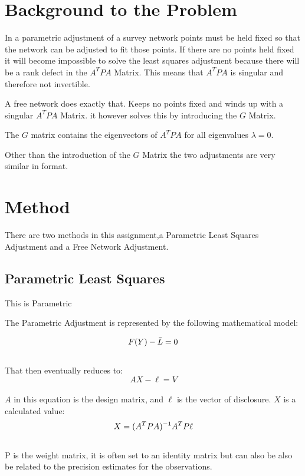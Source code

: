 \documentclass[11pt,a4paper]{article}
\begin{document}
	
	\section{Background to the Problem}
	
	In a parametric adjustment of a survey network points must be held fixed so that the network can be adjusted to fit those points. If there are no points held fixed it will become impossible to solve the least squares adjustment because there will be a rank defect in the $A^TPA$ Matrix. This means that $A^TPA$ is singular and therefore not invertible.
	
	A free network does exactly that. Keeps no points fixed and winds up with a singular $A^TPA$ Matrix. it however solves this by introducing the $G$ Matrix.
	
	The $G$ matrix contains the eigenvectors of $A^TPA$ for all eigenvalues $\lambda = 0$.
	
	Other than the introduction of the $G$ Matrix the two adjustments are very similar in format.

	
	\section{Method}
	
	There are two methods in this assignment,a Parametric Least Squares Adjustment and a Free Network Adjustment.
	
		\subsection{Parametric Least Squares}
		This is Parametric
		
		The Parametric Adjustment is represented by the following mathematical model:
		
		\begin{equation}
		\notag
		F(Y) - \bar{L} = 0
		\end{equation}
		\\
		That then eventually reduces to:
		\begin{equation}
		AX - \ell = V
		\end{equation}
		\\
		$A$ in this equation is the design matrix, and $\ell$ is the vector of disclosure. $X$ is a calculated value:
		\begin{equation}
		\notag
		X = (A^TPA)^{-1} A^TP\ell
		\end{equation}
		\\
		P is the weight matrix, it is often set to an identity matrix but can also be also be related to the precision estimates for the observations.
		
\end{document}
